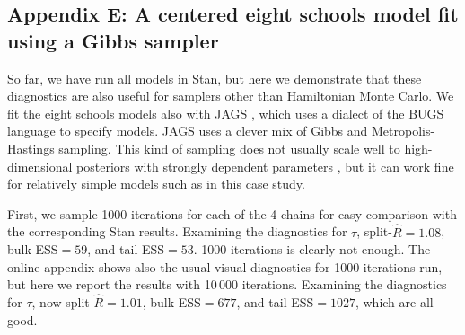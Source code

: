 \documentclass[american,]{article}
\theoremstyle{definition}
\begin{document}
\hypertarget{eight-schools-with-jags}{%
\subsection*{Appendix E: A centered eight schools model fit using a Gibbs sampler}\label{eight-schools-with-jags}}

So far, we have run all models in Stan, but here we demonstrate that
these diagnostics are  also useful for samplers other than 
Hamiltonian Monte Carlo.  We fit the eight schools models also with
 JAGS \citep{plummer2003jags}, which uses a dialect of the BUGS
language \citep{lunn2009bugs} to specify models. JAGS uses a clever
mix of Gibbs and Metropolis-Hastings sampling. This kind of sampling
does not usually scale well to high-dimensional posteriors with strongly
dependent parameters \citep[see, e.g.][]{Hoffman+Gelman:2014}, but it can work fine for relatively simple models such as in this case study.


First, we sample 1000 iterations for each of the 4 chains for easy
comparison with the corresponding Stan results. Examining the
diagnostics for $\tau$, split-\(\widehat{R}=1.08\), bulk-ESS$=59$, and
tail-ESS$=53$. 1000 iterations is clearly not enough. The online
appendix shows also the usual visual diagnostics for 1000 iterations
run, but here we report the results with 10\,000 iterations.
Examining the diagnostics for $\tau$, now split-\(\widehat{R}=1.01\),
bulk-ESS$=677$, and tail-ESS$=1027$, which are all good.
\end{document}
